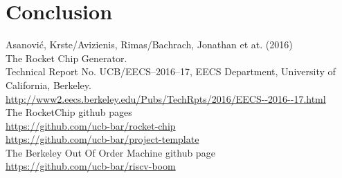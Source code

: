 \documentclass[journal,a4paper]{IEEEtran}
\begin{document}







\section{Conclusion}


\bigskip

\begin{thebibliography}{1}
	Asanovi\'c, Krste/Avizienis, Rimas/Bachrach, Jonathan et at. (2016)\\
	The Rocket Chip Generator.\\
	Technical Report No. UCB/EECS--2016--17, EECS Department, University of California, Berkeley.\\
	\url{http://www2.eecs.berkeley.edu/Pubs/TechRpts/2016/EECS--2016--17.html}\\

	The RocketChip github pages\\
	\url{https://github.com/ucb-bar/rocket-chip}\\
	\url{https://github.com/ucb-bar/project-template}\\

	The Berkeley Out Of Order Machine github page\\
	\url{https://github.com/ucb-bar/riscv-boom}\\


\end{thebibliography}
\enlargethispage{-5in}
\end{document}
